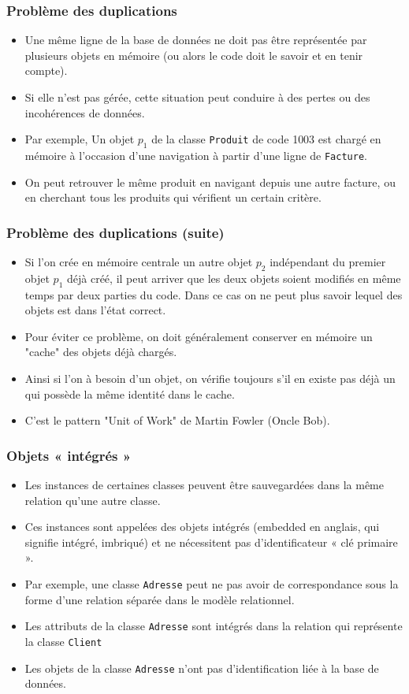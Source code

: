 \documentclass[xcolor=pdftex,x11names,table]{beamer}
\begin{document}
   	\begin{frame}
    \frametitle{Problème des duplications}
		  \begin{itemize}
		  	\item Une même ligne de la base de données ne doit pas être représentée par plusieurs objets en 
		  	mémoire (ou alors le code doit le savoir et en tenir compte).
		  	\item Si elle n’est pas gérée, cette situation peut conduire à des pertes ou des incohérences de données.
				\item Par exemple, Un objet $p_1$ de la classe \texttt{Produit} de code 1003 est chargé en mémoire à l’occasion
							d’une navigation à partir d’une ligne de \texttt{Facture}.
				\item On peut retrouver le même produit en navigant depuis une autre facture, ou en cherchant tous les produits 
				qui vérifient un certain critère.
			\end{itemize}	
   	\end{frame}
   	\begin{frame}
    \frametitle{Problème des duplications (suite)}
		  \begin{itemize}				
				\item Si l'on crée en mémoire centrale un autre objet $p_2$ indépendant du premier objet $p_1$ déjà créé, 
				il peut arriver que les deux objets soient modifiés en même temps par deux parties du code. Dans ce cas on ne 
				peut plus savoir lequel des objets est dans l'état correct.
				\item Pour éviter ce problème, on doit généralement conserver en mémoire un "cache" des objets déjà chargés.
				\item Ainsi si l'on à besoin d'un objet, on vérifie toujours s'il en existe pas déjà un qui possède la même 
				identité dans le cache.
				\item C'est le pattern "Unit of Work" de Martin Fowler (Oncle Bob).
		  \end{itemize}	
   	\end{frame}

		\begin{frame}
    \frametitle{Objets « intégrés »}
		  \begin{itemize}
				\item Les instances de certaines classes peuvent être sauvegardées dans la même relation qu’une autre classe.
				\item Ces instances sont appelées des objets intégrés (embedded en anglais, qui signifie intégré, imbriqué) 
				et ne nécessitent pas d’identificateur « clé primaire ».
				\item Par exemple, une classe \texttt{Adresse} peut ne pas avoir de correspondance sous la forme d’une relation
							séparée dans le modèle relationnel.
				\item Les attributs de la classe \texttt{Adresse} sont intégrés dans la relation qui représente la classe \texttt{Client}
				\item Les objets de la classe \texttt{Adresse} n’ont pas d’identification liée à la base de données.
		  \end{itemize}	
   	\end{frame}
\end{document}
